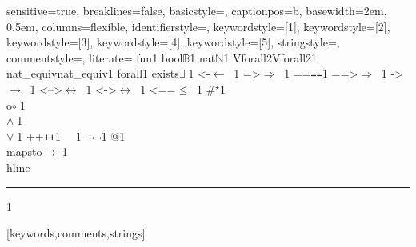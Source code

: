 {sensitive=true,
%
breaklines=false,
%
basicstyle=\small,
%
captionpos=b,
%
basewidth={2em, 0.5em},
columns=flexible,
%
identifierstyle={\ttfamily\color{black}},
keywordstyle=[1]{\ttfamily\bfseries\color{dkviolet}},
keywordstyle=[2]{\ttfamily\bfseries\color{dkgreen}},
keywordstyle=[3]{\ttfamily\bfseries\color{ltblue}},
keywordstyle=[4]{\ttfamily\color{dkblue}},
keywordstyle=[5]{\ttfamily\color{dkred}},
stringstyle=\ttfamily,
commentstyle={\ttfamily\itshape\color{dkgreen}},
%
literate=
    {fun}{{\color{dkgreen}{$\lambda\;$}}}1
    {bool}{{$\mathbb{B}$}}1
    {nat}{{$\mathbb{N}$}}1
    {Vforall2}{Vforall2}1 %
    {nat\_equiv}{nat\_equiv}1 %
    {forall}{{\color{dkgreen}{$\forall\;$}}}1
    {exists}{{$\exists\;$}}1
    {<-}{{$\leftarrow\;\;$}}1
    {=>}{{$\Rightarrow\;\;$}}1
    {==}{{\texttt{==}\;}}1
    {==>}{{$\Longrightarrow\;\;$}}1
    {->}{{$\rightarrow\;\;$}}1
    {<-->}{{$\longleftrightarrow\;\;$}}1
    {<->}{{$\leftrightarrow\;\;$}}1
    {<==}{{$\leq\;\;$}}1
    {\#}{{$^\star$}}1 
    {\\o}{{$\circ\;$}}1 
    {\/\\}{{$\wedge\;$}}1
    {\\\/}{{$\vee\;$}}1
    {++}{{\texttt{++}}}1
    {~}{{\ }}1
    {¬}{{$\lnot$}}1     %
    {\@\@}{{$@$}}1
    {\\mapsto}{{$\mapsto\;$}}1
    {\\hline}{{\rule{\linewidth}{0.5pt}}}1
%
}[keywords,comments,strings]


\def\coqe{\lstinline[language=Coq, basicstyle=\small]}
% pour inliner dans les tableaux / displaymath...
\def\coqes{\lstinline[language=Coq, basicstyle=\scriptsize]}

